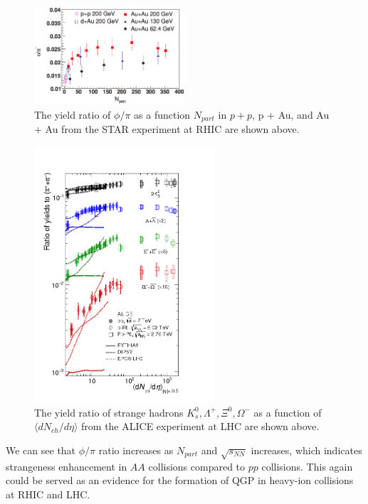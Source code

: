 \begin{figure}[hbtp]
\begin{center}
\includegraphics[width=0.50\textwidth]{Figures/Chapter1/STARPhiOverPi.png}
\caption{The yield ratio of $\phi/\pi$ as a function $N_{part}$ in $p + p$, p + Au, and Au + Au from the STAR experiment at RHIC are shown above.}
\label{PhiRAA1}
\end{center}
\end{figure}   

\begin{figure}[hbtp]
\begin{center}
\includegraphics[width=0.60\textwidth]{Figures/Chapter1/ALICEStrange.png}
\caption{The yield ratio of strange hadrons $K^0_s, \Lambda^+, \Xi^0, \Omega^-$ as a function of $\langle dN_{ch}/d\eta \rangle$ from the ALICE experiment at LHC are shown above.}
\label{PhiRAA2}
\end{center}
\end{figure}   

We can see that $\phi/\pi$ ratio increases as $N_{part}$ and $\sqrt {s_{NN}}$ increases, which indicates strangeness enhancement in $AA$ collisions compared to $pp$ collisions. This again could be served as an evidence for the formation of QGP in heavy-ion collisions at RHIC and LHC. 

